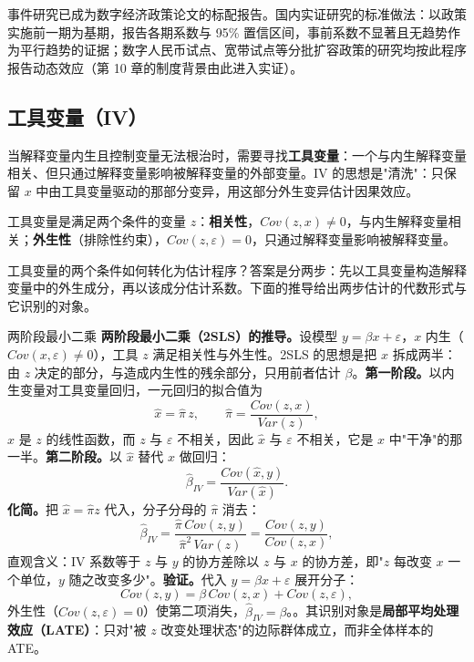 事件研究已成为数字经济政策论文的标配报告。国内实证研究的标准做法：以政策实施前一期为基期，报告各期系数与 95\% 置信区间，事前系数不显著且无趋势作为平行趋势的证据；数字人民币试点、宽带试点等分批扩容政策的研究均按此程序报告动态效应（第 10 章的制度背景由此进入实证）。

\subsection{工具变量（IV）}

当解释变量内生且控制变量无法根治时，需要寻找\textbf{工具变量}：一个与内生解释变量相关、但只通过解释变量影响被解释变量的外部变量。IV 的思想是"清洗"：只保留 $x$ 中由工具变量驱动的那部分变异，用这部分外生变异估计因果效应。

\begin{definition}
工具变量是满足两个条件的变量 $z$：\textbf{相关性}，$Cov(z, x) \neq 0$，与内生解释变量相关；\textbf{外生性}（排除性约束），$Cov(z, \varepsilon) = 0$，只通过解释变量影响被解释变量。
\end{definition}

工具变量的两个条件如何转化为估计程序？答案是分两步：先以工具变量构造解释变量中的外生成分，再以该成分估计系数。下面的推导给出两步估计的代数形式与它识别的对象。

\begin{derivation}{两阶段最小二乘}{}
\textbf{两阶段最小二乘（2SLS）的推导。}设模型 $y = \beta x + \varepsilon$，$x$ 内生（$Cov(x,\varepsilon) \neq 0$），工具 $z$ 满足相关性与外生性。2SLS 的思想是把 $x$ 拆成两半：由 $z$ 决定的部分，与造成内生性的残余部分，只用前者估计 $\beta$。\textbf{第一阶段。}以内生变量对工具变量回归，一元回归的拟合值为
\[
\hat x = \hat\pi\, z, \qquad \hat\pi = \frac{Cov(z, x)}{Var(z)},
\]
$\hat x$ 是 $z$ 的线性函数，而 $z$ 与 $\varepsilon$ 不相关，因此 $\hat x$ 与 $\varepsilon$ 不相关，它是 $x$ 中"干净"的那一半。\textbf{第二阶段。}以 $\hat x$ 替代 $x$ 做回归：
\[
\hat\beta_{IV} = \frac{Cov(\hat x, y)}{Var(\hat x)}.
\]
\textbf{化简。}把 $\hat x = \hat\pi z$ 代入，分子分母的 $\hat\pi$ 消去：
\[
\hat\beta_{IV} = \frac{\hat\pi\, Cov(z, y)}{\hat\pi^2\, Var(z)} = \frac{Cov(z, y)}{Cov(z, x)},
\]
直观含义：IV 系数等于 $z$ 与 $y$ 的协方差除以 $z$ 与 $x$ 的协方差，即"$z$ 每改变 $x$ 一个单位，$y$ 随之改变多少"。\textbf{验证。}代入 $y = \beta x + \varepsilon$ 展开分子：
\[
Cov(z, y) = \beta\, Cov(z, x) + Cov(z, \varepsilon),
\]
外生性（$Cov(z,\varepsilon) = 0$）使第二项消失，$\hat\beta_{IV} = \beta$。。其识别对象是\textbf{局部平均处理效应（LATE）}：只对"被 $z$ 改变处理状态"的边际群体成立，而非全体样本的 ATE。
\end{derivation}

